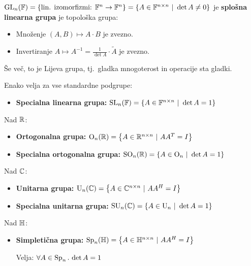 \begin{primer}
\begin{itemize}
        \(\operatorname{GL}_n(\mathbb{F}) = \left\{\text{lin. izomorfizmi: } \mathbb{F}^n \to \mathbb{F}^n\right\} = \left\{A \in \mathbb{F}^{n \times n} \ | \ \det A \neq 0\right\}\) je \textbf{splošna linearna grupa} je topološka grupa:
        \begin{itemize}
            \item Množenje \((A, B) \mapsto A \cdot B\) je zvezno.
            \item Invertiranje \(A \mapsto A^{-1} = \frac{1}{\det A} \cdot \widetilde{A}\) je zvezno.
        \end{itemize}
        \begin{opomba}
            Še več, to je Lijeva grupa, tj.\ gladka mnogoterost in operacije sta gladki.
        \end{opomba}
        Enako velja za vse standardne podgrupe:
        \begin{itemize}
            \item \textbf{Specialna linearna grupa:} \(\operatorname{SL}_n(\mathbb{F}) = \left\{A \in \mathbb{F}^{n \times n} \ | \ \det A = 1\right\}\)            
        \end{itemize}
        Nad \(\mathbb{R}\):
        \begin{itemize}
            \item \textbf{Ortogonalna grupa:} \(\text{O}_n(\mathbb{R}) = \left\{A \in \mathbb{R}^{n \times n} \ | \ AA^T = I\right\}\)
            \item \textbf{Specialna ortogonalna grupa:} \(\text{SO}_n(\mathbb{R}) = \left\{A \in \text{O}_n \ | \ \det A = 1\right\}\)
        \end{itemize} 
        Nad \(\mathbb{C}\):
        \begin{itemize}
            \item \textbf{Unitarna grupa:} \(\text{U}_n(\mathbb{C}) = \left\{A \in \mathbb{C}^{n \times n} \ | \ AA^H = I\right\}\)
            \item \textbf{Specialna unitarna grupa:} \(\text{SU}_n(\mathbb{C}) = \left\{A \in \text{U}_n \ | \ \det A = 1\right\}\)
        \end{itemize} 
        Nad \(\mathbb{H}\):
        \begin{itemize}
            \item \textbf{Simpletična grupa:} \(\text{Sp}_n(\mathbb{H}) = \left\{A \in \mathbb{H}^{n \times n} \ | \ AA^H = I\right\}\)
            \begin{opomba}
                Velja: \(\forall A \in \text{Sp}_n \,.\, \det A = 1\)
            \end{opomba}
        \end{itemize}
    \end{itemize}   
\end{primer}

